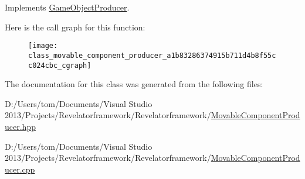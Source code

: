 Implements \hyperlink{class_game_object_producer_a572ce99f29ffaa2beb0231756281d403}{Game\-Object\-Producer}.



Here is the call graph for this function\-:\nopagebreak
\begin{figure}[H]
\begin{center}
\leavevmode
\texttt{[image: class\_movable\_component\_producer\_a1b83286374915b711d4b8f55cc024cbc\_cgraph]}
\end{center}
\end{figure}




The documentation for this class was generated from the following files\-:\begin{DoxyCompactItemize}
\item 
D\-:/\-Users/tom/\-Documents/\-Visual Studio 2013/\-Projects/\-Revelatorframework/\-Revelatorframework/\hyperlink{_movable_component_producer_8hpp}{Movable\-Component\-Producer.\-hpp}\item 
D\-:/\-Users/tom/\-Documents/\-Visual Studio 2013/\-Projects/\-Revelatorframework/\-Revelatorframework/\hyperlink{_movable_component_producer_8cpp}{Movable\-Component\-Producer.\-cpp}\end{DoxyCompactItemize}
